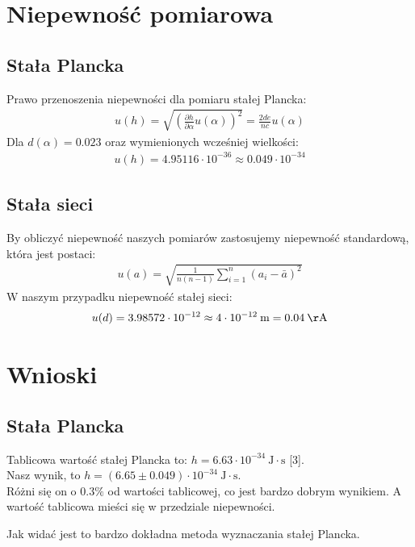 \documentclass[paper=a4, fontsize=12pt]{scrartcl}
\begin{document}
\section{Niepewność pomiarowa}
\subsection{Stała Plancka}
Prawo przenoszenia niepewności dla pomiaru stałej Plancka:
\begin{align*}
u(h)=\sqrt{\left(\frac{\partial h}{\partial \alpha}u(\alpha)\right)^2}=\frac{2d e}{nc}u(\alpha)
\end{align*}
Dla $d(\alpha)=0.023$ oraz wymienionych wcześniej wielkości:
\begin{align*}
u(h)=4.95116\cdot 10^{-36}\approx0.049\cdot 10^{-34}
\end{align*}
\subsection{Stała sieci}
By obliczyć niepewność naszych pomiarów zastosujemy niepewność standardową, która jest postaci:
\begin{align}
u(a)=\sqrt{\frac{1}{n(n-1)}\sum\limits_{i=1}^{n}\left(a_i-\bar{a}\right)^2}
\end{align}
W naszym przypadku niepewność stałej sieci:
\begin{align*}
u(d)=3.98572\cdot10^{-12}\approx 4\cdot10^{-12}\:\mathrm{m}=0.04\:\mathrm{\AA}
\end{align*}
\section{Wnioski}
\subsection{Stała Plancka}
Tablicowa wartość stałej Plancka to: $h=6.63\cdot 10^{-34}\:\mathrm{J\cdot s}$ [3].\\
Nasz wynik, to $h=(6.65\pm0.049)\cdot 10^{-34}\:\mathrm{J\cdot s}$. \\Różni się on o $0.3\%$ od wartości tablicowej, co jest bardzo dobrym wynikiem. A wartość tablicowa mieści się w przedziale niepewności.

Jak widać jest to bardzo dokładna metoda wyznaczania stałej Plancka.
\end{document}
